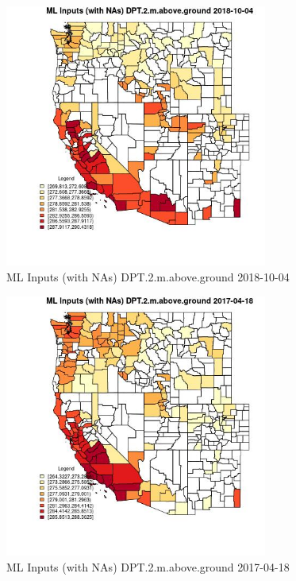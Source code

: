 \begin{figure} 
\centering  
\includegraphics[width=0.77\textwidth]{Code_Outputs/Report_ML_input_PM25_Step4_part_f_de_duplicated_aves_prioritize_24hr_obswNAs_CountyDPT2mabovegroundMean2018-10-04.jpg} 
\caption{\label{fig:Report_ML_input_PM25_Step4_part_f_de_duplicated_aves_prioritize_24hr_obswNAsCountyDPT2mabovegroundMean2018-10-04}ML Inputs (with NAs) DPT.2.m.above.ground 2018-10-04} 
\end{figure} 
 

\begin{figure} 
\centering  
\includegraphics[width=0.77\textwidth]{Code_Outputs/Report_ML_input_PM25_Step4_part_f_de_duplicated_aves_prioritize_24hr_obswNAs_CountyDPT2mabovegroundMean2017-04-18.jpg} 
\caption{\label{fig:Report_ML_input_PM25_Step4_part_f_de_duplicated_aves_prioritize_24hr_obswNAsCountyDPT2mabovegroundMean2017-04-18}ML Inputs (with NAs) DPT.2.m.above.ground 2017-04-18} 
\end{figure} 
 

